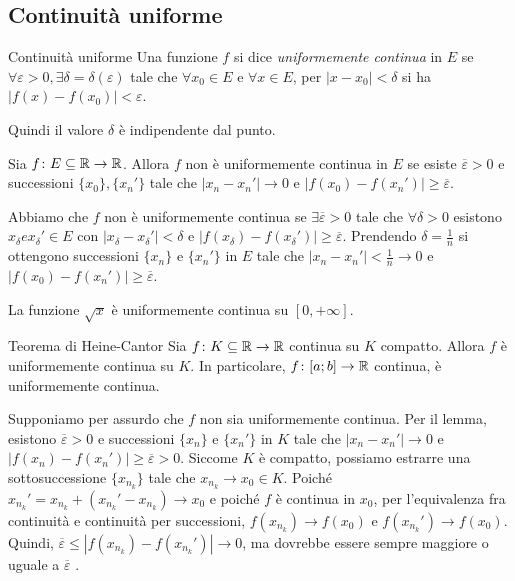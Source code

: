 \documentclass[a4paper]{article}
\begin{document}
\subsection{Continuità uniforme}

\begin{snippetdefinition}{Continuità uniforme}
    Una funzione \(f\) si dice \emph{uniformemente continua} in \(E\)
    se \(\forall \varepsilon > 0, \exists \delta = \delta(\varepsilon)\)
    tale che \(\forall x_0 \in E\) e \(\forall x \in E\), per \(|x-x_0| < \delta\)
    si ha \(|f(x) - f(x_0)| < \varepsilon\).
\end{snippetdefinition}

Quindi il valore \(\delta\) è indipendente dal punto.

\begin{snippetlemma}{}
    Sia \(f\colon E \subseteq \mathbb{R} \to \mathbb{R}\).
    Allora \(f\) non è uniformemente continua in \(E\) se esiste \(\overline{\varepsilon} > 0\)
    e successioni \(\{x_0\}, \{x_n'\}\) tale che \(|x_n - x_n'| \to 0\)
    e \(|f(x_0) - f(x_n')| \geq \overline{\varepsilon}\).
\end{snippetlemma}

\begin{snippetproof}{}
    Abbiamo che \(f\) non è uniformemente continua se
    \(\exists \overline{\varepsilon} > 0\) tale che \(\forall \delta>0\)
    esistono \(x_\delta e x_\delta' \in E\) con \(|x_\delta - x_\delta'| < \delta\)
    e \(|f(x_\delta) - f(x_\delta')| \geq \overline{\varepsilon}\).
    Prendendo \(\delta = \frac{1}{n}\) si ottengono successioni \(\{x_n\}\)
    e \(\{x_n'\}\) in \(E\) tale che \(|x_n - x_n'| < \frac{1}{n} \to 0\)
    e \(|f(x_0) - f(x_n')| \geq \overline{\varepsilon}\).
\end{snippetproof}

La funzione \(\sqrt{x}\) è uniformemente continua su \([0, +\infty]\).

\begin{snippettheorem}{Teorema di Heine-Cantor}
    Sia \(f \colon K \subseteq \mathbb{R} \to \mathbb{R}\)
    continua su \(K\) compatto. Allora \(f\) è uniformemente continua su \(K\).
    In particolare, \(f\colon [a;b] \to \mathbb{R}\) continua, è uniformemente continua.
\end{snippettheorem}

\begin{snippetproof}{}
    Supponiamo per assurdo che \(f\) non sia uniformemente continua.
    Per il lemma, esistono \(\overline{\varepsilon} > 0\) e successioni
    \(\{x_n\}\) e \(\{x_n'\}\) in \(K\) tale che \(|x_n-x_n'| \to 0\)
    e \(|f(x_n) - f(x_n')| \geq \overline{\varepsilon} > 0\).
    Siccome \(K\) è compatto, possiamo estrarre una sottosuccessione \(\{x_{n_k}\}\)
    tale che \(x_{n_k} \to x_0 \in K\).
    Poiché \(x_{n_k}' = x_{n_k} + (x_{n_k}' - x_{n_k}) \to x_0\)
    e poiché \(f\) è continua in \(x_0\),
    per l'equivalenza fra continuità e continuità per successioni,
    \(f(x_{n_k}) \to f(x_0)\) e \(f(x_{n_k}') \to f(x_0)\).
    Quindi, \(\overline{\varepsilon} \leq |f(x_{n_k}) - f(x_{n_k}')| \to 0\), ma dovrebbe essere sempre
    maggiore o uguale a \(\overline{\varepsilon}\) \lightning.
\end{snippetproof}
\end{document}

